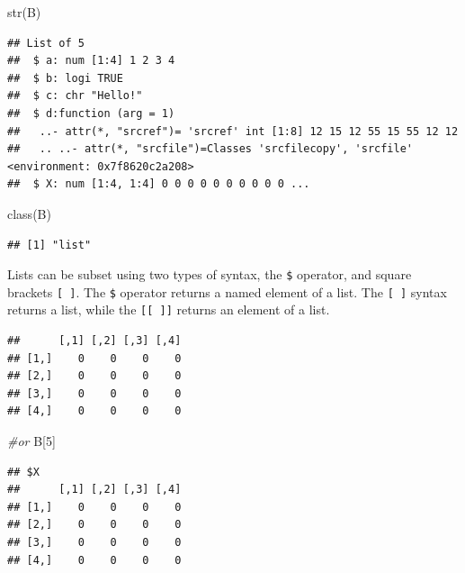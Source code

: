 \documentclass[
]{book}
\newenvironment{Shaded}{\begin{snugshade}}{\end{snugshade}}
\newcommand{\CommentTok}[1]{\textcolor[rgb]{0.56,0.35,0.01}{\textit{#1}}}
\newcommand{\DecValTok}[1]{\textcolor[rgb]{0.00,0.00,0.81}{#1}}
\newcommand{\FunctionTok}[1]{\textcolor[rgb]{0.00,0.00,0.00}{#1}}
\newcommand{\NormalTok}[1]{#1}
\newcommand{\SpecialCharTok}[1]{\textcolor[rgb]{0.00,0.00,0.00}{#1}}
\theoremstyle{definition}
\theoremstyle{definition}
\theoremstyle{definition}
\theoremstyle{definition}
\theoremstyle{remark}
\begin{document}
\begin{Shaded}
\begin{Highlighting}[]
\FunctionTok{str}\NormalTok{(B)}
\end{Highlighting}
\end{Shaded}

\begin{verbatim}
## List of 5
##  $ a: num [1:4] 1 2 3 4
##  $ b: logi TRUE
##  $ c: chr "Hello!"
##  $ d:function (arg = 1)  
##   ..- attr(*, "srcref")= 'srcref' int [1:8] 12 15 12 55 15 55 12 12
##   .. ..- attr(*, "srcfile")=Classes 'srcfilecopy', 'srcfile' <environment: 0x7f8620c2a208> 
##  $ X: num [1:4, 1:4] 0 0 0 0 0 0 0 0 0 0 ...
\end{verbatim}

\begin{Shaded}
\begin{Highlighting}[]
\FunctionTok{class}\NormalTok{(B)}
\end{Highlighting}
\end{Shaded}

\begin{verbatim}
## [1] "list"
\end{verbatim}

Lists can be subset using two types of syntax, the \texttt{\$} operator, and square brackets \texttt{{[}\ {]}}. The \texttt{\$} operator returns a named element of a list. The \texttt{{[}\ {]}} syntax returns a list, while the \texttt{{[}{[}\ {]}{]}} returns an element of a list.

\begin{Shaded}
\end{Shaded}

\begin{verbatim}
##      [,1] [,2] [,3] [,4]
## [1,]    0    0    0    0
## [2,]    0    0    0    0
## [3,]    0    0    0    0
## [4,]    0    0    0    0
\end{verbatim}

\begin{Shaded}
\begin{Highlighting}[]
\CommentTok{\#or}
\NormalTok{B[}\DecValTok{5}\NormalTok{]}
\end{Highlighting}
\end{Shaded}

\begin{verbatim}
## $X
##      [,1] [,2] [,3] [,4]
## [1,]    0    0    0    0
## [2,]    0    0    0    0
## [3,]    0    0    0    0
## [4,]    0    0    0    0
\end{verbatim}
\end{document}
